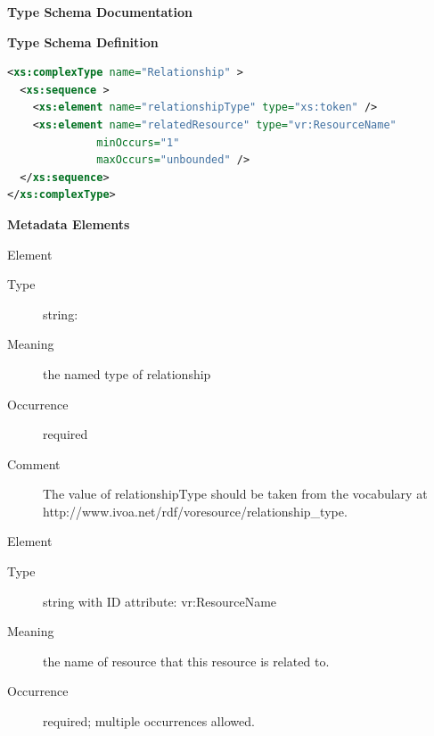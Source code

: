 \documentclass[11pt,a4paper]{ivoa}
\begin{document}
\begin{generated}
\begingroup
      	\renewcommand*\descriptionlabel[1]{%
      	\hbox to 5.5em{\emph{#1}\hfil}}\vspace{2ex}\noindent\textbf{ Type Schema Documentation}


\vspace{1ex}\noindent\textbf{ Type Schema Definition}

\begin{lstlisting}[language=XML,basicstyle=\footnotesize]
<xs:complexType name="Relationship" >
  <xs:sequence >
    <xs:element name="relationshipType" type="xs:token" />
    <xs:element name="relatedResource" type="vr:ResourceName"
              minOccurs="1"
              maxOccurs="unbounded" />
  </xs:sequence>
</xs:complexType>
\end{lstlisting}

\vspace{0.5ex}\noindent\textbf{ Metadata Elements}

\begingroup\small\begin{bigdescription}\item[Element \xmlel{relationshipType}]
\begin{description}
\item[Type] string: 
\item[Meaning] 
                  the named type of relationship
               
\item[Occurrence] required
\item[Comment] 
                 The value  of relationshipType should be taken from the 
                 vocabulary at
                 http://www.ivoa.net/rdf/voresource/relationship\_type.
               

\end{description}
\item[Element \xmlel{relatedResource}]
\begin{description}
\item[Type] string with ID attribute: vr:ResourceName
\item[Meaning] 
                  the name of resource that this resource is related to.
               
\item[Occurrence] required; multiple occurrences allowed.

\end{description}


\end{bigdescription}\endgroup

\endgroup
\end{generated}
\end{document}
